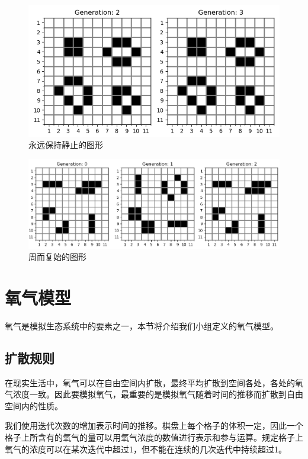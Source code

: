 \documentclass{ctexart}
\begin{document}
\begin{figure}[ht]
  \centering
  \includegraphics[scale=0.75]{classic-fixed.png}
  \caption{永远保持静止的图形}
  \label{fig:classic-fixed}
\end{figure}

\begin{figure}[ht]
  \centering
  \includegraphics[width=\textwidth]{classic-vibrating.png}
  \caption{周而复始的图形}
  \label{fig:classic-vibrating}
\end{figure}

\section{氧气模型}

氧气是模拟生态系统中的要素之一，本节将介绍我们小组定义的氧气模型。

\subsection{扩散规则}

在现实生活中，氧气可以在自由空间内扩散，最终平均扩散到空间各处，各处的氧气浓度一致。因此要模拟氧气，最重要的是模拟氧气随着时间的推移而扩散到自由空间内的性质。

我们使用迭代次数的增加表示时间的推移。棋盘上每个格子的体积一定，因此一个格子上所含有的氧气的量可以用氧气浓度的数值进行表示和参与运算。规定格子上氧气的浓度可以在某次迭代中超过1，但不能在连续的几次迭代中持续超过1。
\end{document}
